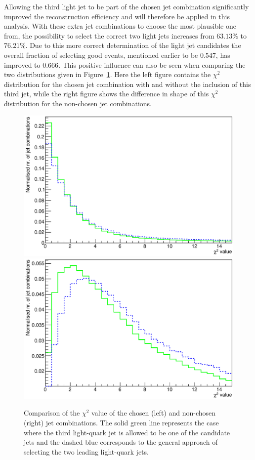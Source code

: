 Allowing the third light jet to be part of the chosen jet combination significantly improved the reconstruction efficiency and will therefore be applied in this analysis.
With these extra jet combinations to choose the most plausible one from, the possibility to select the correct two light jets increases from $63.13 \%$ to $76.21 \%$.
Due to this more correct determination of the light jet candidates the overall fraction of selecting good events, mentioned earlier to be 0.547, has improved to $0.666$.
This positive influence can also be seen when comparing the two distributions given in Figure~\ref{fig::ChiSq_4vs5Jets}. 
Here the left figure contains the $\chi^{2}$ distribution for the chosen jet combination with and without the inclusion of this third jet, while the right figure shows the difference in shape of this $\chi^{2}$ distribution for the non-chosen jet combinations.
\begin{figure}[h!t]
 \centering
 \includegraphics[width = 0.47 \textwidth]{Chapters/Chapter4_EvtSel/Figures/LowestChiSqComparison.pdf} \hspace{0.2cm}
 \includegraphics[width = 0.47 \textwidth]{Chapters/Chapter4_EvtSel/Figures/WrongChiSqComparison.pdf}    %
 \caption{Comparison of the $\chi^{2}$ value of the chosen (left) and non-chosen (right) jet combinations. The solid green line represents the case where the third light-quark jet is allowed to be one of the candidate jets and the dashed blue corresponds to the general approach of selecting the two leading light-quark jets.} \label{fig::ChiSq_4vs5Jets}
\end{figure}

